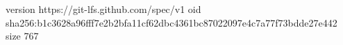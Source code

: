 version https://git-lfs.github.com/spec/v1
oid sha256:b1c3628a96fff7e2b2bfa11cf62dbc4361bc87022097e4c7a77f73bdde27e442
size 767
